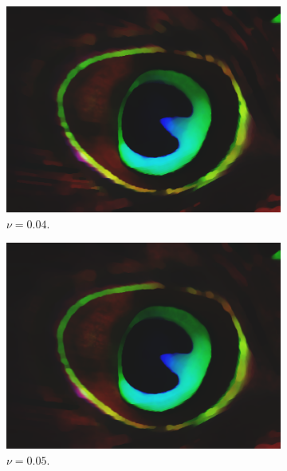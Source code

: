 \documentclass[abstracton]{scrreprt}
\begin{document}
\begin{figure}[!ht]
\begin{subfigure}[b]{0.16\textwidth}
                    \includegraphics[width=\textwidth]{img/segmentation/cr/004peacock-feather.png}
                    \caption{$\nu = 0.04$.}
                \end{subfigure}
                \begin{subfigure}[b]{0.16\textwidth}
                    \includegraphics[width=\textwidth]{img/segmentation/cr/005peacock-feather.png}
                    \caption{$\nu = 0.05$.}
                \end{subfigure}
                \begin{subfigure}[b]{0.16\textwidth}

\end{subfigure}
\end{figure}
\end{document}
